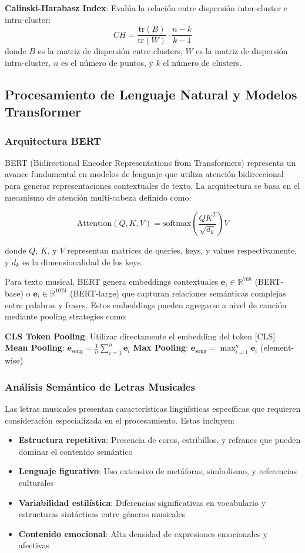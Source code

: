 \documentclass[12pt,a4paper]{article}
\begin{document}
\textbf{Calinski-Harabasz Index}: Evalúa la relación entre dispersión inter-cluster e intra-cluster:
\[CH = \frac{\text{tr}(B)}{\text{tr}(W)} \cdot \frac{n-k}{k-1}\]
donde $B$ es la matriz de dispersión entre clusters, $W$ es la matriz de dispersión intra-cluster, $n$ es el número de puntos, y $k$ el número de clusters.

\subsection{Procesamiento de Lenguaje Natural y Modelos Transformer}

\subsubsection{Arquitectura BERT}

BERT (Bidirectional Encoder Representations from Transformers) representa un avance fundamental en modelos de lenguaje que utiliza atención bidireccional para generar representaciones contextuales de texto. La arquitectura se basa en el mecanismo de atención multi-cabeza definido como:

\[\text{Attention}(Q, K, V) = \text{softmax}\left(\frac{QK^T}{\sqrt{d_k}}\right)V\]

donde $Q$, $K$, y $V$ representan matrices de queries, keys, y values respectivamente, y $d_k$ es la dimensionalidad de los keys.

Para texto musical, BERT genera embeddings contextuales $\mathbf{e}_i \in \mathbb{R}^{768}$ (BERT-base) o $\mathbf{e}_i \in \mathbb{R}^{1024}$ (BERT-large) que capturan relaciones semánticas complejas entre palabras y frases. Estos embeddings pueden agregarse a nivel de canción mediante pooling strategies como:

\textbf{CLS Token Pooling}: Utilizar directamente el embedding del token [CLS]
\textbf{Mean Pooling}: $\mathbf{e}_{\text{song}} = \frac{1}{n}\sum_{i=1}^{n} \mathbf{e}_i$
\textbf{Max Pooling}: $\mathbf{e}_{\text{song}} = \max_{i=1}^{n} \mathbf{e}_i$ (element-wise)

\subsubsection{Análisis Semántico de Letras Musicales}

Las letras musicales presentan características lingüísticas específicas que requieren consideración especializada en el procesamiento. Estas incluyen:

\begin{itemize}
    \item \textbf{Estructura repetitiva}: Presencia de coros, estribillos, y refranes que pueden dominar el contenido semántico
    \item \textbf{Lenguaje figurativo}: Uso extensivo de metáforas, simbolismo, y referencias culturales
    \item \textbf{Variabilidad estilística}: Diferencias significativas en vocabulario y estructuras sintácticas entre géneros musicales
    \item \textbf{Contenido emocional}: Alta densidad de expresiones emocionales y afectivas
\end{itemize}
\end{document}

